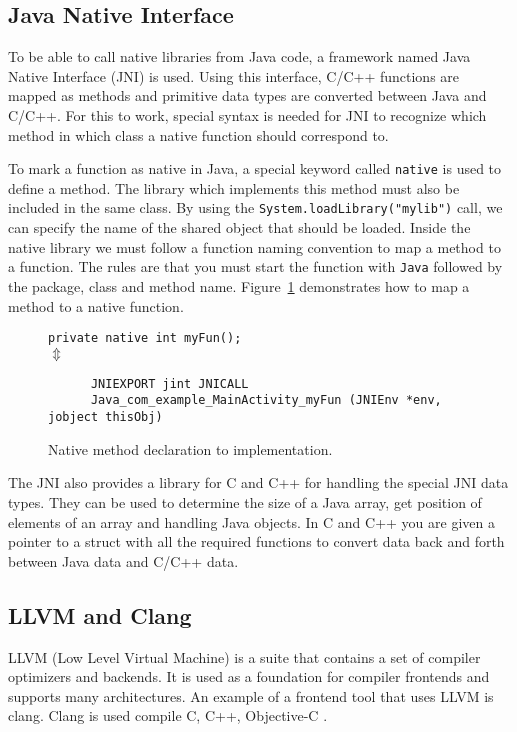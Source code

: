 \subsection{Java Native Interface}
To be able to call native libraries from Java code, a framework named Java Native Interface (JNI) is used. Using this interface, C/C++ functions are mapped as methods and primitive data types are converted between Java and C/C++. For this to work, special syntax is needed for JNI to recognize which method in which class a native function should correspond to.

To mark a function as native in Java, a special keyword called \texttt{native} is used to define a method. The library which implements this method must also be included in the same class. By using the \texttt{System.loadLibrary("mylib")} call, we can specify the name of the shared object that should be loaded. Inside the native library we must follow a function naming convention to map a method to a function. The rules are that you must start the function with \texttt{Java} followed by the package, class and method name. Figure~\ref{fig:native} demonstrates how to map a method to a native function.

\begin{figure}
\begin{center}
    \texttt{private native int myFun();}\\
    $\Updownarrow$
    \begin{verbatim}
      JNIEXPORT jint JNICALL
      Java_com_example_MainActivity_myFun (JNIEnv *env, jobject thisObj)
    \end{verbatim}
\end{center}
\caption{Native method declaration to implementation.}
\label{fig:native}
\end{figure}

The JNI also provides a library for C and C++ for handling the special JNI data types. They can be used to determine the size of a Java array, get position of elements of an array and handling Java objects. In C and C++ you are given a pointer to a struct with all the required functions to convert data back and forth between Java data and C/C++ data.

\subsection{LLVM and Clang}
LLVM (Low Level Virtual Machine) is a suite that contains a set of compiler optimizers and backends. It is used as a foundation for compiler frontends and supports many architectures. An example of a frontend tool that uses LLVM is \gls{clang}. Clang is used compile C, C++, Objective-C \cite{clang:comp}.

